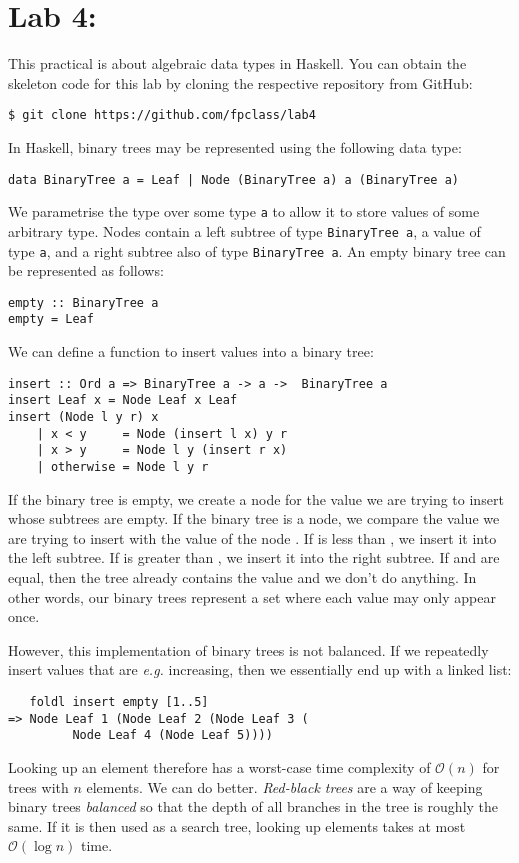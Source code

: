 \section{Lab 4: \practicalFourTitle}

This practical is about algebraic data types in Haskell. You can obtain the skeleton code for this lab by cloning the respective repository from GitHub:
\begin{verbatim}
$ git clone https://github.com/fpclass/lab4
\end{verbatim}
In Haskell, binary trees may be represented using the following data type:
\begin{verbatim}
data BinaryTree a = Leaf | Node (BinaryTree a) a (BinaryTree a)
\end{verbatim}
We parametrise the  type over some type \texttt{\small a} to allow it to store values of some arbitrary type. Nodes contain a left subtree of type \texttt{\small BinaryTree a}, a value of type \texttt{\small a}, and a right subtree also of type \texttt{\small BinaryTree a}. An empty binary tree can be represented as follows:
\begin{verbatim}
empty :: BinaryTree a
empty = Leaf
\end{verbatim}
We can define a function to insert values into a binary tree:
\begin{verbatim}
insert :: Ord a => BinaryTree a -> a ->  BinaryTree a
insert Leaf x = Node Leaf x Leaf
insert (Node l y r) x
    | x < y     = Node (insert l x) y r 
    | x > y     = Node l y (insert r x) 
    | otherwise = Node l y r
\end{verbatim}
If the binary tree is empty, we create a node for the value  we are trying to insert whose subtrees are empty. If the binary tree is a node, we compare the value  we are trying to insert with the value of the node . If  is less than , we insert it into the left subtree. If  is greater than , we insert it into the right subtree. If  and  are equal, then the tree already contains the value and we don't do anything. In other words, our binary trees represent a set where each value may only appear once.

However, this implementation of binary trees is not balanced. If we repeatedly insert values that are \emph{e.g.} increasing, then we essentially end up with a linked list:
\begin{verbatim}
   foldl insert empty [1..5]
=> Node Leaf 1 (Node Leaf 2 (Node Leaf 3 (
         Node Leaf 4 (Node Leaf 5))))
\end{verbatim}
Looking up an element therefore has a worst-case time complexity of $\mathcal{O}(n)$ for trees with $n$ elements. We can do better. \emph{Red-black trees} are a way of keeping binary trees \emph{balanced} so that the depth of all branches in the tree is roughly the same. If it is then used as a search tree, looking up elements takes at most $\mathcal{O}(\log n)$ time.


